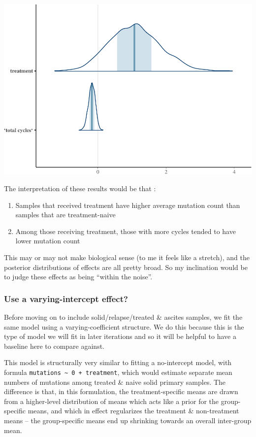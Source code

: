 \documentclass[]{article}
\begin{document}
\includegraphics{Hierarchical_model_mutations_and_peptides_files/figure-latex/psolid-trt2-coef-plot-1.pdf}

The interpretation of these results would be that :

\begin{enumerate}
\def\labelenumi{\arabic{enumi}.}
\itemsep1pt\parskip0pt
\item
  Samples that received treatment have higher average mutation count
  than samples that are treatment-naive
\item
  Among those receiving treatment, those with more cycles tended to have
  lower mutation count
\end{enumerate}

This may or may not make biological sense (to me it feels like a
stretch), and the posterior distributions of effects are all pretty
broad. So my inclination would be to judge these effects as being
``within the noise''.

\subsubsection{Use a varying-intercept
effect?}\label{use-a-varying-intercept-effect}

Before moving on to include solid/relapse/treated \& ascites samples, we
fit the same model using a varying-coefficient structure. We do this
because this is the type of model we will fit in later iterations and so
it will be helpful to have a baseline here to compare against.

This model is structurally very similar to fitting a no-intercept model,
with formula \texttt{mutations \textasciitilde{} 0 + treatment}, which
would estimate separate mean numbers of mutations among treated \& naive
solid primary samples. The difference is that, in this formulation, the
treatment-specific means are drawn from a higher-level distribution of
means which acts like a prior for the group-specific means, and which in
effect regularizes the treatment \& non-treatment means -- the
group-specific means end up shrinking towards an overall inter-group
mean.
\end{document}
